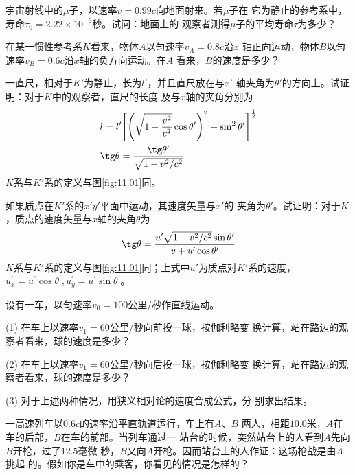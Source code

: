 \documentclass[../outline-of-mechanics.tex]{subfiles}
\begin{document}
\begin{exercises}

\exercise 宇宙射线中的$ \mu $子，以速率$ v = 0 . 9 9 c $向地面射来。若$ \mu $子在
它为静止的参考系中，寿命$ \tau _ { 0 } = 2 . 2 2 \times 1 0 ^ { - 6 } $秒。试问：地面上的
观察者测得$ \mu $子的平均寿命$ \tau $为多少？

\exercise 在某一惯性参考系$ K $看来，物体$ A $以匀速率$ v _ { A } = 0 . 8 c $沿$ x $
轴正向运动，物体$ B $以匀速率$ v _ { B } = 0 . 6 c $沿$ x $轴的负方向运动。在$ A $
看来，$ B $的速度是多少？

\exercise 一直尺，相对于$ K' $为静止，长为$ l' $，并且直尺放在与$ x' $
轴夹角为$ \theta ' $的方向上。试证明：对于$ K $中的观察者，直尺的长度
及与$ x $轴的夹角分别为
\begin{align*}
   & l=l^{\prime}\Bigg[\Bigg(\sqrt{1-\frac{v^{2}}{c^{2}}} \cos \theta^{\prime}\Bigg)^{2}+\sin ^{2} \theta^{\prime}\Bigg]^{\frac{1}{2}} \\
   & \tg \theta=\frac{\tg \theta^{\prime}}{\sqrt{1-v^{2} / c^{2}}}
\end{align*}
$ K $系与$ K' $系的定义与图\ref{fig:11.01}同。

\exercise 如果质点在$ K' $系的$ x'y' $平面中运动，其速度矢量与$ x' $的
夹角为$ \theta ' $。试证明：对于$ K $，质点的速度矢量与$ x $轴的夹角$ \theta $为
\begin{equation*}
  \tg \theta=\frac{u^{\prime} \sqrt{1-v^{2} / c^{2}} \sin \theta^{\prime}}{v+u^{\prime} \cos \theta^{\prime}}
\end{equation*}
$ K $系与$ K' $系的定义与图\ref{fig:11.01}同；上式中$ u' $为质点对$ K' $系的速度，
$ u _ x ^ { \prime } = u ^ { \prime } \cos \theta ^ { \prime } , u _ y ^ { \prime } = u ^ { \prime } \sin \theta ^ { \prime } $。

\exercise 设有一车，以匀速率$ v _ { 0 } = 1 0 0 $公里/秒作直线运动。

(1) 在车上以速率$ v _ { 1 } = 6 0 $公里/秒向前投一球，按伽利略变
换计算，站在路边的观察者看来，球的速度是多少？

(2) 在车上以速率$ v _ { 1 } = 6 0 $公里/秒向后投一球，按伽利略变
换计算，站在路边的观察者看来，球的速度是多少？

(3) 对于上述两种情况，用狭义相对论的速度合成公式，分
别求出结果。

\exercise 一高速列车以$ 0.6c $的速率沿平直轨道运行，车上有$ A $、$ B $
两人，相距$ 10.0 $米，$ A $在车的后部，$ B $在车的前部。当列车通过一
站台的时候，突然站台上的人看到$ A $先向$ B $开枪，过了$ 12.5 $毫微
秒，$ B $又向$ A $开枪。因而站台上的人作证：这场枪战是由$ A $挑起
的。假如你是车中的乘客，你看见的情况是怎样的？


\end{exercises}
\end{document}
